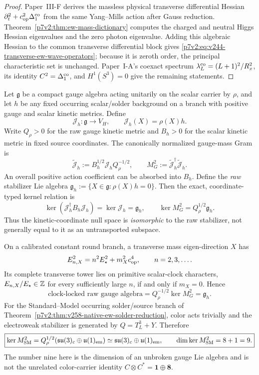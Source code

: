\documentclass[12pt,a4paper]{article}
\begin{document}
\begin{proof}
Paper~III-F derives the massless physical transverse differential Hessian
\(\partial_t^2+c_{\rm op}^2\Delta_1^{\rm co}\) from the same Yang--Mills
action after Gauss reduction.  Theorem~\ref{p7v2:thm:ew-mass-dictionary}
computes the charged and neutral Higgs Hessian eigenvalues and the zero photon
eigenvalue.  Adding this algebraic Hessian to the common transverse
differential block gives
\eqref{p7v2:eq:v244-transverse-ew-wave-operators}; because it is zeroth order,
the principal characteristic set is unchanged.  Paper~I-A's coexact spectrum
\(\lambda_L^{\rm co}=(L+1)^2/R_x^2\), its identity
\(C^2=\Delta_1^{\rm co}\), and \(H^1(S^3)=0\) give the remaining statements.
\end{proof}


\begin{theorem}
\label{p7v2:thm:v245-gauge-hessian-kernel-clock-lock}
Let \(\mathfrak g\) be a compact gauge algebra acting unitarily on the scalar
carrier by \(\rho\), and let \(h\) be any fixed occurring scalar/solder
background on a branch with positive gauge and scalar kinetic metrics.  Define
\[
 \mathcal J_h:\mathfrak g\to V_H,
 \qquad
 \mathcal J_h(X)=\rho(X)h.
\]
Write \(Q_\rho>0\) for the raw gauge kinetic metric and
\(B_h>0\) for the scalar kinetic metric in fixed source coordinates.
The canonically normalized gauge-mass Gram is
\[
 \widetilde{\mathcal J}_h:=B_h^{1/2}\mathcal J_h Q_\rho^{-1/2},
 \qquad M_G^2:=\widetilde{\mathcal J}_h^\dagger
                       \widetilde{\mathcal J}_h.
\]
An overall positive action coefficient can be absorbed into \(B_h\).
Define the \emph{raw} stabilizer Lie algebra
\(\mathfrak g_h:=\{X\in\mathfrak g:\rho(X)h=0\}\).
Then the exact, coordinate-typed kernel relation is
\[
 \boxed{\ker(\mathcal J_h^\dagger B_h\mathcal J_h)
   =\ker\mathcal J_h=\mathfrak g_h,
 \qquad \ker M_G^2=Q_\rho^{1/2}\mathfrak g_h.}
\]
Thus the kinetic-coordinate null space is \emph{isomorphic} to the raw
stabilizer, not generally equal to it as an untransported subspace.

On a calibrated constant round branch, a transverse mass eigen-direction
\(X\) has
\[
 E_{n,X}^2=n^2E_\star^2+m_X^2c_{\rm op}^4,
 \qquad n=2,3,\ldots .
\]
Its complete transverse tower lies on primitive scalar-clock characters,
\(E_{n,X}/E_\star\in\mathbb Z\) for every sufficiently large \(n\), if and
only if \(m_X=0\).  Hence
\[
 \boxed{\text{clock-locked raw gauge algebra}
 =Q_\rho^{-1/2}\ker M_G^2=\mathfrak g_h.}
\]
For the Standard--Model occurring solder/source branch of Theorem~\ref{p7v2:thm:v258-native-ew-solder-reduction}, color acts trivially and the electroweak stabilizer is generated by \(Q=T_L^3+Y\).  Therefore
\[
 \boxed{\ker M_{\rm SM}^2
 =Q_\rho^{1/2}(\mathfrak{su}(3)_c\oplus\mathfrak u(1)_{\rm em})
 \simeq\mathfrak{su}(3)_c\oplus\mathfrak u(1)_{\rm em},
 \qquad \dim\ker M_{\rm SM}^2=8+1=9.}
\]
The number nine here is the dimension of an unbroken gauge Lie algebra and is
not the unrelated color-carrier identity \(C\otimes C^*=\mathbf1\oplus\mathbf8\).
\end{theorem}
\end{document}
